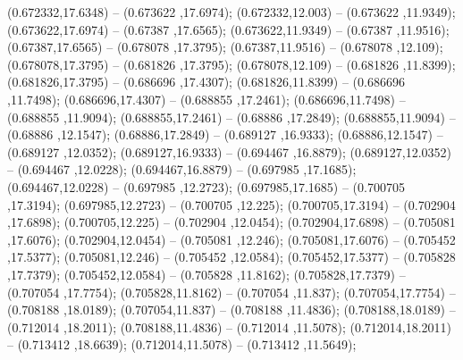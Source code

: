 (0.672332,17.6348) -- (0.673622 ,17.6974);
 (0.672332,12.003) -- (0.673622 ,11.9349);
 (0.673622,17.6974) -- (0.67387 ,17.6565);
 (0.673622,11.9349) -- (0.67387 ,11.9516);
 (0.67387,17.6565) -- (0.678078 ,17.3795);
 (0.67387,11.9516) -- (0.678078 ,12.109);
 (0.678078,17.3795) -- (0.681826 ,17.3795);
 (0.678078,12.109) -- (0.681826 ,11.8399);
 (0.681826,17.3795) -- (0.686696 ,17.4307);
 (0.681826,11.8399) -- (0.686696 ,11.7498);
 (0.686696,17.4307) -- (0.688855 ,17.2461);
 (0.686696,11.7498) -- (0.688855 ,11.9094);
 (0.688855,17.2461) -- (0.68886 ,17.2849);
 (0.688855,11.9094) -- (0.68886 ,12.1547);
 (0.68886,17.2849) -- (0.689127 ,16.9333);
 (0.68886,12.1547) -- (0.689127 ,12.0352);
 (0.689127,16.9333) -- (0.694467 ,16.8879);
 (0.689127,12.0352) -- (0.694467 ,12.0228);
 (0.694467,16.8879) -- (0.697985 ,17.1685);
 (0.694467,12.0228) -- (0.697985 ,12.2723);
 (0.697985,17.1685) -- (0.700705 ,17.3194);
 (0.697985,12.2723) -- (0.700705 ,12.225);
 (0.700705,17.3194) -- (0.702904 ,17.6898);
 (0.700705,12.225) -- (0.702904 ,12.0454);
 (0.702904,17.6898) -- (0.705081 ,17.6076);
 (0.702904,12.0454) -- (0.705081 ,12.246);
 (0.705081,17.6076) -- (0.705452 ,17.5377);
 (0.705081,12.246) -- (0.705452 ,12.0584);
 (0.705452,17.5377) -- (0.705828 ,17.7379);
 (0.705452,12.0584) -- (0.705828 ,11.8162);
 (0.705828,17.7379) -- (0.707054 ,17.7754);
 (0.705828,11.8162) -- (0.707054 ,11.837);
 (0.707054,17.7754) -- (0.708188 ,18.0189);
 (0.707054,11.837) -- (0.708188 ,11.4836);
 (0.708188,18.0189) -- (0.712014 ,18.2011);
 (0.708188,11.4836) -- (0.712014 ,11.5078);
 (0.712014,18.2011) -- (0.713412 ,18.6639);
 (0.712014,11.5078) -- (0.713412 ,11.5649);

